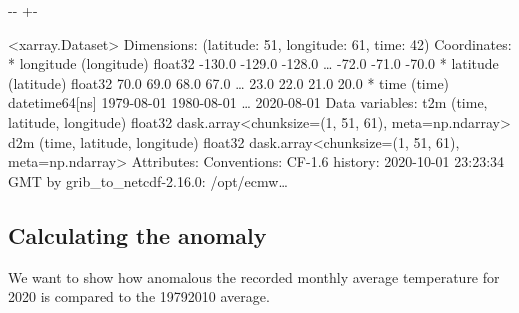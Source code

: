 \documentclass[letterpaper,10pt,english]{sphinxmanual}
\newlength\nbsphinxcodecellspacing
\begin{document}
{

\kern-\sphinxverbatimsmallskipamount\kern-\baselineskip
\kern+\FrameHeightAdjust\kern-\fboxrule
\vspace{\nbsphinxcodecellspacing}

\begin{sphinxVerbatim}[commandchars=\\\{\}]
\llap{\color{nbsphinxout}[4]:\,\hspace{\fboxrule}\hspace{\fboxsep}}<xarray.Dataset>
Dimensions:    (latitude: 51, longitude: 61, time: 42)
Coordinates:
  * longitude  (longitude) float32 -130.0 -129.0 -128.0 {\ldots} -72.0 -71.0 -70.0
  * latitude   (latitude) float32 70.0 69.0 68.0 67.0 {\ldots} 23.0 22.0 21.0 20.0
  * time       (time) datetime64[ns] 1979-08-01 1980-08-01 {\ldots} 2020-08-01
Data variables:
    t2m        (time, latitude, longitude) float32 dask.array<chunksize=(1, 51, 61), meta=np.ndarray>
    d2m        (time, latitude, longitude) float32 dask.array<chunksize=(1, 51, 61), meta=np.ndarray>
Attributes:
    Conventions:  CF-1.6
    history:      2020-10-01 23:23:34 GMT by grib\_to\_netcdf-2.16.0: /opt/ecmw{\ldots}
\end{sphinxVerbatim}
}


\subsection{Calculating the anomaly}
\label{\detokenize{Notebooks/California_august_temperature_anomaly:Calculating-the-anomaly}}
We want to show how anomalous the recorded monthly average temperature for 2020 is compared to the 1979\sphinxhyphen{}2010 average.
\end{document}
